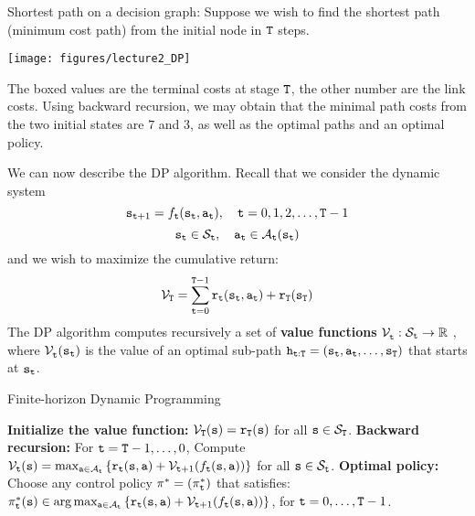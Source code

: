 \begin{example}
Shortest path on a decision graph:  Suppose we wish to find the
shortest path (minimum cost path) from the initial node in
${\tt T}$ steps.

\begin{centering}
\texttt{[image: figures/lecture2\_DP]}
\end{centering}

\medskip
The boxed values are the terminal costs at stage ${\tt T}$, the
other number are the link costs. Using backward recursion, we may
obtain that the minimal path costs from the two initial states are
$7$ and $3$, as well as the optimal paths and an optimal policy.
\end{example}

We can now describe the DP algorithm. Recall that we consider the dynamic system
$${{\tt s}_{{\tt t} + 1}} = {f_{{\tt t}}}({{\tt s}_{{\tt t}}},{{\tt a}_{{\tt t}}}),\quad {\tt t} = 0,1,2, \ldots ,{\tt T} - 1$$
$${{\tt s}_{{\tt t}}} \in {\mathcal{S}_{{\tt t}}},\quad {{\tt a}_{{\tt t}}} \in {\mathcal{A}_{{\tt t}}}({{\tt s}_{{\tt t}}})$$
and we wish to maximize the cumulative return:
$${\mathcal{V}_{\tt T}} = \sum_{{\tt t} = 0}^{{\tt T} - 1} {{{\tt r}_{{\tt t}}}({{\tt s}_{{\tt t}}},{{\tt a}_{{\tt t}}}) + {{\tt r}_{\tt T}}({{\tt s}_{\tt T}})} $$
The DP algorithm computes recursively a set of \textbf{value
functions} $\mathcal{V}_{{\tt t}}^{}:{\mathcal{S}_{{\tt t}}} \to \mathbb{R}$ , where
$\mathcal{V}_{{\tt t}}^{}({{\tt s}_{{\tt t}}})$ is the value of an optimal
sub-path ${{\tt h}_{{\tt t}:{\tt T}}} =
({{\tt s}_{{\tt t}}},{{\tt a}_{{\tt t}}}, \ldots ,{{\tt s}_{\tt T}})$
that starts at ${{\tt s}_{{\tt t}}}$.


\begin{algorithm}
\caption{Finite-horizon Dynamic Programming}
\label{Alg:FHDP-DDP}
\begin{algorithmic}[1]
\State \textbf{Initialize the value function:}
\State \quad $\mathcal{V}_{\tt T}({\tt s}) = {\tt r}_{\tt T}({\tt s})$ for all ${\tt s} \in \mathcal{S}_{\tt T}$.
\State \textbf{Backward recursion:} For ${\tt t} = {\tt T} - 1, \ldots ,0$,
\State \quad Compute $\mathcal{V}_{{\tt t}}({\tt s}) = \max_{{\tt a} \in \mathcal{A}_{{\tt t}}} \left\{ {\tt r}_{{\tt t}}({\tt s},{\tt a}) + \mathcal{V}_{{\tt t} + 1}(f_{{\tt t}}({\tt s},{\tt a})) \right\}$ for all ${\tt s} \in \mathcal{S}_{{\tt t}}$.
\State \textbf{Optimal policy:} Choose any control policy $\pi^*  = (\pi^*_{{\tt t}})$ that satisfies:
\State \quad $\pi^*_{{\tt t}}({\tt s}) \in \arg \max_{{\tt a} \in \mathcal{A}_{{\tt t}}} \left\{ {\tt r}_{{\tt t}}({\tt s},{\tt a}) + \mathcal{V}_{{\tt t} + 1}(f_{{\tt t}}({\tt s},{\tt a})) \right\}$, for ${\tt t} = 0, \ldots ,{\tt T} - 1$.
\end{algorithmic}
\end{algorithm}

